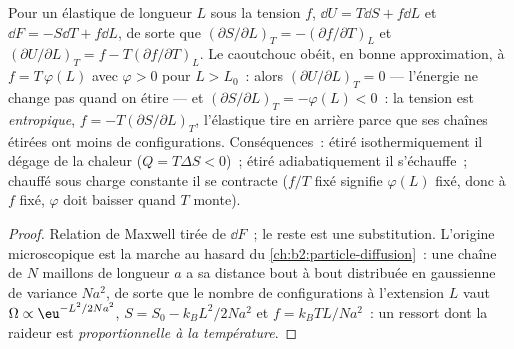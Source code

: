 \begin{proposition}\label{prop:b2:thermodynamic-potentials:rubber}
Pour un élastique de longueur $L$ sous la tension $f$, $\dd U = T\dd S + f\dd L$
et $\dd F = -S\dd T + f\dd L$, de sorte que $(\partial S/\partial L)_T =
-(\partial f/\partial T)_L$ et $(\partial U/\partial L)_T = f - T(\partial f/
\partial T)_L$. Le caoutchouc obéit, en bonne approximation, à $f = T\,\varphi(L)$
avec $\varphi > 0$ pour $L > L_0$~: alors $(\partial U/\partial L)_T = 0$ ---
l'énergie ne change pas quand on étire --- et $(\partial S/\partial L)_T =
-\varphi(L) < 0$~: la tension est \emph{entropique}, $f = -T(\partial S/\partial
L)_T$, l'élastique tire en arrière parce que ses chaînes étirées ont moins de
configurations. Conséquences~: étiré isothermiquement il dégage de la chaleur
($Q = T\Delta S < 0$)~; étiré adiabatiquement il s'échauffe~; chauffé sous
charge constante il se contracte ($f/T$ fixé signifie $\varphi(L)$ fixé, donc à
$f$ fixé, $\varphi$ doit baisser quand $T$ monte).
\end{proposition}

\begin{proof}
Relation de Maxwell tirée de $\dd F$~; le reste est une substitution.
L'origine microscopique est la marche au hasard du \cref{ch:b2:particle-diffusion}~:
une chaîne de $N$ maillons de longueur $a$ a sa distance bout à bout
distribuée en gaussienne de variance $Na^2$, de sorte que le nombre de
configurations à l'extension $L$ vaut $\Omega \propto \eu^{-L^2/2Na^2}$, $S = S_0 -
k_BL^2/2Na^2$ et $f = k_BTL/Na^2$~: un ressort dont la raideur est
\emph{proportionnelle à la température}.
\end{proof}

